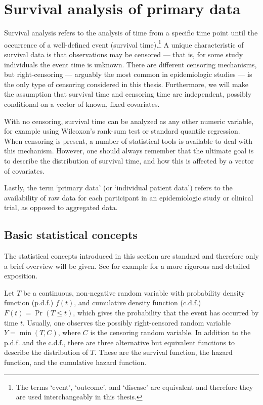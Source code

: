 %

\section{Survival analysis of primary data}
\label{section:saipd}

Survival analysis refers to the analysis of time from a specific time point until the occurrence of a well-defined event (survival time).\footnote{The terms `event', `outcome', and `disease' are equivalent and therefore they are used interchangeably in this thesis.} A unique characteristic of survival data is that observations may be censored --- that is, for some study individuals the event time is unknown. There are different censoring mechanisms, but right-censoring --- arguably the most common in epidemiologic studies --- is the only type of censoring considered in this thesis. Furthermore, we will make the assumption that survival time and censoring time are independent, possibly conditional on a vector of known, fixed covariates.

With no censoring, survival time can be analyzed as any other numeric variable, for example using Wilcoxon's rank-sum test or standard quantile regression. 
When censoring is present, a number of statistical tools is available to deal with this mechanism. However, one should always remember that the ultimate goal is to describe the distribution of survival time, and how this is affected by a vector of covariates. 

Lastly, the term `primary data' (or `individual patient data') refers to the availability of raw data for each participant in an epidemiologic study or clinical trial, as opposed to aggregated data.

\subsection{Basic statistical concepts}
\label{section:basicstatconcepts}

The statistical concepts introduced in this section are standard and therefore only a brief overview will be given. See for example \citet{kleinbaum_survival_2012} for a more rigorous and detailed exposition.

Let $T$ be a continuous, non-negative random variable with probability density function (p.d.f.) $f(t)$, and cumulative density function (c.d.f.) $F(t) = \Pr(T \le t)$, which gives the probability that the event has occurred by time $t$. Usually, one observes the possibly right-censored random variable $Y = \min(T, C)$, where $C$ is the censoring random variable. In addition to the p.d.f. and the c.d.f., there are three  alternative but equivalent  functions to describe the distribution of $T$. These are the survival function, the hazard function, and the cumulative hazard function.

